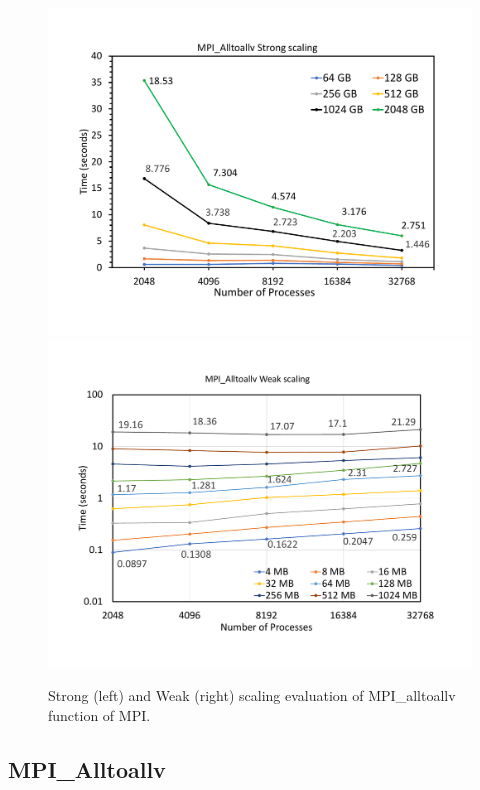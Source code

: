 


\begin{figure}[t]
	{\includegraphics[width=.50\textwidth,  trim={0cm 0cm 0cm 0cm, 
			clip}]{results/all_to_all_strong.pdf}}\hfill%
	{\includegraphics[width=.50\textwidth,  trim={0cm 0cm 0cm 0cm,
			clip}]{results/all_to_all_weak.pdf}}\hfill%
	\centering
	\caption{Strong (left) and Weak (right) scaling evaluation of MPI\_alltoallv function of MPI. }
	\label{fig:all_to_all}
\end{figure}


\subsection{MPI\_Alltoallv}
\label{sec:all_to_all}


